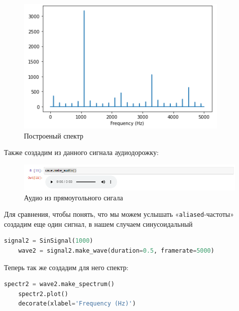 \documentclass[a4paper]{article}
\begin{document}
            \begin{figure}[H]
                \centering
                \includegraphics[width=\textwidth]{ex_3_square.png}
                \caption{Построеный спектр}
                \label{fig:ex_3_square}
            \end{figure}
            
            Также создадим из данного сигнала аудиодорожку:
            
            \begin{figure}[H]
                \centering
                \includegraphics[width=\textwidth]{ex_3_square_audio.png}
                \caption{Аудио из прямоугольного сигала}
                \label{fig:ex_3_square_audio}
            \end{figure}
            
            Для сравнения, чтобы понять, что мы можем услышать «\texttt{aliased}-частоты» создадим еще один сигнал, в нашем случаем синусоидальный
            
\begin{lstlisting}[language=Python, caption= Построение синусоидального сигнала]
    signal2 = SinSignal(1000)
    wave2 = signal2.make_wave(duration=0.5, framerate=5000)
\end{lstlisting}    
            
            Теперь так же создадим для него спектр:
            
\begin{lstlisting}[language=Python, caption= Построение спектра]
    spectr2 = wave2.make_spectrum()
    spectr2.plot()
    decorate(xlabel='Frequency (Hz)')
\end{lstlisting}               
            
\end{document}
